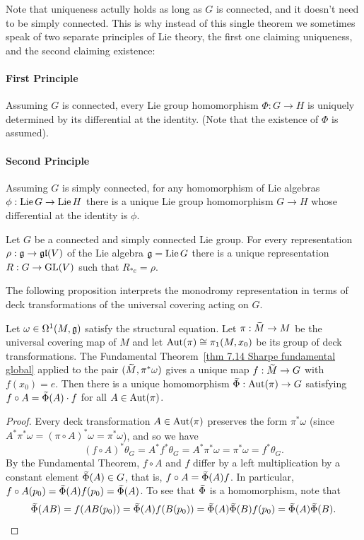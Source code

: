 \begin{rem}
    Note that uniqueness actully holds as long as $G$ is connected, and it doesn't need to be simply connected. This is why instead of this single theorem we sometimes speak of two separate principles of Lie theory, the first one claiming uniqueness, and the second claiming existence:

    \paragraph{First Principle} Assuming $G$ is connected, every Lie group homomorphism $\Phi:G\to H$ is uniquely determined by its differential at the identity. (Note that the existence of $\Phi$ is assumed).

    \paragraph{Second Principle} Assuming $G$ is simply connected, for any homomorphism of Lie algebras $\phi:\operatorname{Lie} G\to \operatorname{Lie} H$ there is a unique Lie group homomorphism $G\to H$ whose differential at the identity is $\phi$.
\end{rem}

\begin{cor}\label{cor generated homomorphism}
    Let $G$ be a connected and simply connected Lie group. For every representation $\rho:\mathfrak{g}\to \mathfrak{gl}(V)$ of the Lie algebra $\mathfrak{g}=\operatorname{Lie} G$ there is a unique representation $R:G\to \operatorname{GL}(V)$ such that $R_{\ast e}=\rho$.
\end{cor}

The following proposition interprets the monodromy representation in terms of deck transformations of the universal covering acting on $G$.

\begin{prop}\label{prop 8.1 Sharpe}
    Let $\omega\in\Omega^1(M,\mathfrak{g})$ satisfy the structural equation. Let $\pi:\wt{M}\to M$ be the universal covering map of $M$ and let $\operatorname{Aut}(\pi)\cong \pi_1(M,x_0)$ be its group of deck transformations. The Fundamental Theorem~\ref{thm 7.14 Sharpe fundamental global} applied to the pair $(\wt{M},\pi^\ast\omega)$ gives a unique map $f:\wt{M}\to G$ with $f(x_0)=e$. Then there is a unique homomorphism $\wt{\Phi}: \Aut(\pi)\to G$ satisfying $f\circ A=\wt{\Phi}(A)\cdot f$ for all $A\in\operatorname{Aut}(\pi)$.
\end{prop}
\begin{proof}
    Every deck transformation $A\in \operatorname{Aut}(\pi)$ preserves the form $\pi^\ast\omega$ (since $A^\ast \pi^\ast\omega=(\pi\circ A)^\ast\omega=\pi^\ast\omega$), and so we have
    \[(f\circ A)^\ast\theta_G=A^\ast f^\ast\theta_G=A^\ast \pi^\ast\omega=\pi^\ast\omega=f^\ast\theta_G.\]
    By the Fundamental Theorem, $f\circ A$ and $f$ differ by a left multiplication by a constant element $\wt{\Phi}(A)\in G$, that is, $f\circ A=\wt{\Phi}(A)f$. In particular, $f\circ A(p_0)=\wt{\Phi}(A)f(p_0)=\wt{\Phi}(A)$. To see that $\wt{\Phi}$ is a homomorphism, note that 
    \[\wt{\Phi}(AB)=f(AB(p_0))=\wt{\Phi}(A)f(B(p_0))=\wt{\Phi}(A)\wt{\Phi}(B)f(p_0)=\wt{\Phi}(A)\wt{\Phi}(B).\]
\end{proof}

